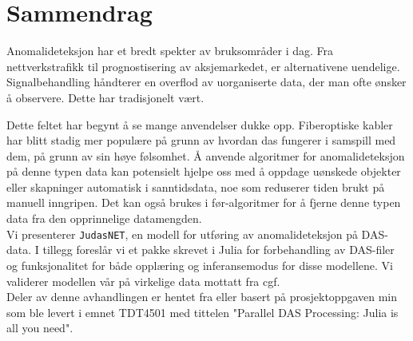 \chapter*{Sammendrag}

Anomalideteksjon har et bredt spekter av bruksområder i dag. Fra nettverkstrafikk til prognostisering av aksjemarkedet, er alternativene uendelige. Signalbehandling håndterer en overflod av uorganiserte data, der man ofte ønsker å observere. Dette har tradisjonelt vært.

Dette feltet har begynt å se mange anvendelser dukke opp. Fiberoptiske kabler har blitt stadig mer populære på grunn av hvordan \acrshort{das} fungerer i samspill med dem, på grunn av sin høye følsomhet. Å anvende algoritmer for anomalideteksjon på denne typen data kan potensielt hjelpe oss med å oppdage uønskede objekter eller skapninger automatisk i sanntidsdata, noe som reduserer tiden brukt på manuell inngripen. Det kan også brukes i før-algoritmer for å fjerne denne typen data fra den opprinnelige datamengden. \\

Vi presenterer \texttt{JudasNET}, en modell for utføring av anomalideteksjon på DAS-data. I tillegg foreslår vi et pakke skrevet i Julia for forbehandling av DAS-filer \cite{projthesis} og funksjonalitet for både opplæring og inferansemodus for disse modellene. Vi validerer modellen vår på virkelige data mottatt fra \acrfull{cgf}.   \\

Deler av denne avhandlingen er hentet fra eller basert på prosjektoppgaven min som ble levert i emnet TDT4501 med tittelen "Parallel DAS Processing: Julia is all you need".
